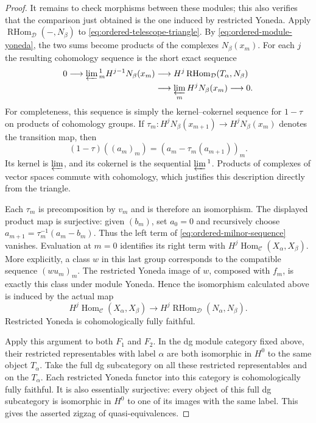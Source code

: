 \documentclass[11pt]{article}
\numberwithin{equation}{section}
\theoremstyle{definition}
\theoremstyle{remark}
\newcommand{\Hom}{\operatorname{Hom}}
\begin{document}
\begin{proof}
It remains to check morphisms between these modules; this also verifies
that the comparison just obtained is the one induced by restricted
Yoneda.  Apply $\operatorname{RHom}_{\mathcal D}(-,N_\beta)$ to
\eqref{eq:ordered-telescope-triangle}.  By
\eqref{eq:ordered-module-yoneda}, the two sums become products of the
complexes $N_\beta(x_m)$.  For each $j$ the resulting cohomology sequence
is the short exact sequence
\begin{equation}
\begin{split}
 0\longrightarrow
 \varprojlim{}^1_m H^{j-1}N_\beta(x_m)
 &\longrightarrow H^j\operatorname{RHom}_{\mathcal D}(T_\alpha,N_\beta)\\
 &\longrightarrow \varprojlim_m H^jN_\beta(x_m)
 \longrightarrow0.
\end{split}
\label{eq:ordered-milnor-sequence}
\end{equation}
For completeness, this sequence is simply the kernel--cokernel sequence
for $1-\tau$ on products of cohomology groups.  If
$\tau_m:H^jN_\beta(x_{m+1})\to H^jN_\beta(x_m)$ denotes the transition
map, then
\[
 (1-\tau)((a_m)_m)=(a_m-\tau_m(a_{m+1}))_m.
\]
Its kernel is $\varprojlim$, and its cokernel is the sequential
$\varprojlim{}^1$.  Products of complexes of vector spaces commute with
cohomology, which justifies this description directly from the triangle.

Each $\tau_m$ is precomposition by $v_m$ and is therefore an
isomorphism.  The displayed product map is surjective: given $(b_m)$,
set $a_0=0$ and recursively choose
$a_{m+1}=\tau_m^{-1}(a_m-b_m)$.  Thus the left term of
\eqref{eq:ordered-milnor-sequence} vanishes.  Evaluation at $m=0$
identifies its right term with
$H^j\Hom_{\mathcal C}(X_\alpha,X_\beta)$.
More explicitly, a class $w$ in this last group corresponds to the
compatible sequence $(w u_m)_m$.  The restricted Yoneda image of $w$,
composed with $f_m$, is exactly this class under module Yoneda.  Hence
the isomorphism calculated above is induced by the actual map
\[
 H^j\Hom_{\mathcal C}(X_\alpha,X_\beta)
 \longrightarrow
 H^j\operatorname{RHom}_{\mathcal D}(N_\alpha,N_\beta).
\]
Restricted Yoneda is cohomologically fully faithful.

Apply this argument to both $F_1$ and $F_2$.  In the dg module category
fixed above, their restricted representables with label $\alpha$
are both isomorphic in $H^0$ to the same object $T_\alpha$.  Take the full dg
subcategory on all these restricted representables and on the
$T_\alpha$.  Each restricted Yoneda functor into this category is
cohomologically fully faithful.  It is also essentially surjective:
every object of this full dg subcategory is isomorphic in $H^0$ to one
of its images with the same label.  This gives the asserted zigzag of
quasi-equivalences.
\end{proof}
\end{document}
